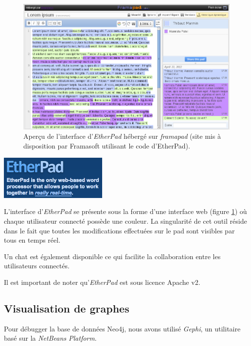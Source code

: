 \begin{figure}[H]
	\includegraphics[width=\textwidth]{files/outils/etherpad_screenshot}	
	\caption{Aperçu de l'interface d'\emph{EtherPad} hébergé sur \emph{framapad} (site mis à disposition par Framasoft utilisant le code d'EtherPad).}
	\label{etherpad_screenshot}
\end{figure}

\begin{center}
\includegraphics[width=0.4\textwidth]{files/outils/etherpad}
\end{center}

L'interface d'\emph{EtherPad} se présente sous la forme d'une interface web (figure \ref{etherpad_screenshot}) où chaque utilisateur connecté possède une couleur. La singularité de cet outil réside dans le fait que toutes les modifications effectuées sur le pad sont visibles par tous en temps réel.

Un chat est également disponible ce qui facilite la collaboration entre les utilisateurs connectés.

Il est important de noter qu'\emph{EtherPad} est sous licence \gls{Apache v2}.

\subsection{Visualisation de graphes}

Pour débugger la base de données Neo4j, nous avons utilisé \emph{Gephi}, un utilitaire basé sur la \emph{NetBeans Platform}.


